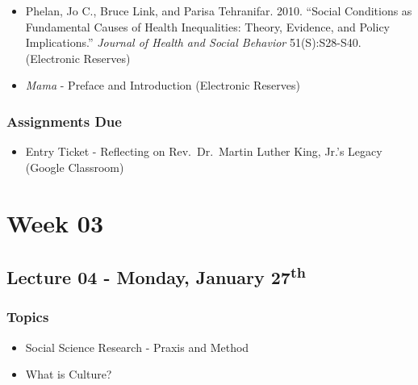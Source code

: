 \documentclass[]{book}
\providecommand{\tightlist}{%
  \setlength{\itemsep}{0pt}\setlength{\parskip}{0pt}}
\begin{document}
\begin{itemize}
\tightlist
\item
  Phelan, Jo C., Bruce Link, and Parisa Tehranifar. 2010. ``Social Conditions as Fundamental Causes of Health Inequalities: Theory, Evidence, and Policy Implications.'' \emph{Journal of Health and Social Behavior} 51(S):S28-S40. (Electronic Reserves)
\item
  \emph{Mama} - Preface and Introduction (Electronic Reserves)
\end{itemize}

\hypertarget{assignments-due-1}{%
\subsubsection*{Assignments Due}\label{assignments-due-1}}

\begin{itemize}
\tightlist
\item
  Entry Ticket - Reflecting on Rev.~Dr.~Martin Luther King, Jr.'s Legacy (Google Classroom)
\end{itemize}

\newpage

\hypertarget{week-03}{%
\section*{Week 03}\label{week-03}}

\hypertarget{lecture-04---monday-january-27th}{%
\subsection*{\texorpdfstring{Lecture 04 - Monday, January 27\textsuperscript{th}}{Lecture 04 - Monday, January 27th}}\label{lecture-04---monday-january-27th}}

\hypertarget{topics-4}{%
\subsubsection*{Topics}\label{topics-4}}

\begin{itemize}
\tightlist
\item
  Social Science Research - Praxis and Method
\item
  What is Culture?
\end{itemize}
\end{document}
